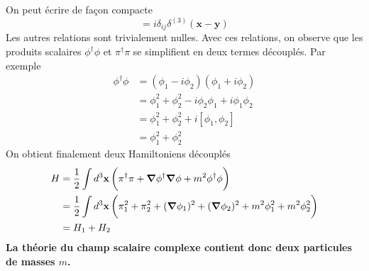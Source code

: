 \documentclass{article}
\numberwithin{equation}{section}
\begin{document}
On peut écrire de façon compacte 
\begin{equation}
        [\phi_i(\mathbf{x}, t), \pi_j(\mathbf{y}, t)] = i \delta_{ij} \delta^{(3)}(\mathbf{x} - \mathbf{y})
\end{equation} 
Les autres relations sont trivialement nulles. Avec ces relations, on observe que les produits scalaires $\phi^{\dagger}\phi$ et $\pi^{\dagger}\pi$ se simplifient en deux termes 
découplés. Par exemple
\begin{align*}
        \phi^{\dagger} \phi &=  (\phi_1 - i\phi_2)(\phi_1 + i \phi_2) \\
        &= \phi_1^2 + \phi_2^2 - i\phi_2\phi_1 + i\phi_1 \phi_2 \\
        &= \phi_1^2 + \phi_2^2 + i[\phi_1, \phi_2] \\
        &= \phi_1^2 + \phi_2^2
\end{align*}
On obtient finalement deux Hamiltoniens découplés
\begin{align*}
        H &= \frac{1}{2}\int d^{3}\mathbf{x}\, \bigg(\pi^{\dagger}\pi + \grad \phi^{\dagger} \grad \phi + m^{2} \phi^{\dagger}\phi \bigg) \\
        &= \frac{1}{2} \int d^{3}\mathbf{x}\, \bigg( \pi_1^{2} + \pi_2^{2} + (\grad \phi_1)^2 + (\grad \phi_2)^2 + m^{2}\phi_1^2 + m^2 \phi_2^2  \bigg) \\
        &= H_1 + H_2
\end{align*}
\textbf{La théorie du champ scalaire complexe contient donc deux particules de masses $m$.}
\end{document}
